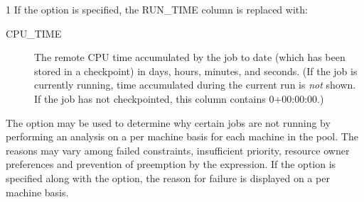 \begin{ManPage}{\label{man-condor-q}}{1}
If the  option is specified, the RUN\_TIME 
column is replaced with:

\begin{description}
\item[CPU\_TIME] The remote CPU time accumulated by the job to date
(which has been stored in a checkpoint) in days, hours, minutes, and
seconds.  (If the job is currently running, time accumulated during
the current run is \emph{not} shown.  If the job has not checkpointed,
this column contains 0+00:00:00.)
\end{description}

The  option may be used to determine why certain jobs are not
running by performing an analysis on a per machine basis for each machine in 
the pool.  The reasons may vary among failed constraints, insufficient priority,
resource owner preferences and prevention of preemption by the 
 expression.  If the  option is specified 
along with the  option, the reason for failure is displayed on a 
per machine basis.


\end{ManPage}
